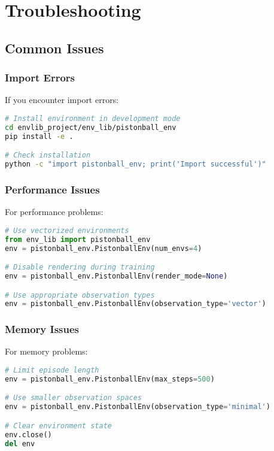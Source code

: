 \section{Troubleshooting}

\subsection{Common Issues}

\subsubsection{Import Errors}

If you encounter import errors:

\begin{lstlisting}[language=bash, caption=Fixing Import Issues]
# Install environment in development mode
cd envlib_project/env_lib/pistonball_env
pip install -e .

# Check installation
python -c "import pistonball_env; print('Import successful')"
\end{lstlisting}

\subsubsection{Performance Issues}

For performance problems:

\begin{lstlisting}[language=python, caption=Performance Optimization]
# Use vectorized environments
from env_lib import pistonball_env
env = pistonball_env.PistonballEnv(num_envs=4)

# Disable rendering during training
env = pistonball_env.PistonballEnv(render_mode=None)

# Use appropriate observation types
env = pistonball_env.PistonballEnv(observation_type='vector')
\end{lstlisting}

\subsubsection{Memory Issues}

For memory problems:

\begin{lstlisting}[language=python, caption=Memory Management]
# Limit episode length
env = pistonball_env.PistonballEnv(max_steps=500)

# Use smaller observation spaces
env = pistonball_env.PistonballEnv(observation_type='minimal')

# Clear environment state
env.close()
del env
\end{lstlisting}

